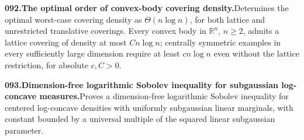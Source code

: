\documentclass[11pt,a4paper]{article}
\begin{document}
  \par \begin{minipage}{\linewidth}
  \fontsize{10.5}{12.6}\selectfont\RaggedRight
  \hypertarget{result 092}{}
  {\bfseries\textcolor{muted}{092.}\enspace The optimal order of convex-body covering density.}\enspace Determines the optimal worst-case covering density as $\Theta(n\log n)$, for both lattice and unrestricted translative coverings. Every convex body in $\mathbb R^n$, $n\ge2$, admits a lattice covering of density at most $Cn\log n$; centrally symmetric examples in every sufficiently large dimension require at least $cn\log n$ even without the lattice restriction, for absolute $c,C>0$.\par
  \end{minipage}\par\vspace{5pt}



  \par \begin{minipage}{\linewidth}
  \fontsize{10.5}{12.6}\selectfont\RaggedRight
  \hypertarget{result 093}{}
  {\bfseries\textcolor{muted}{093.}\enspace Dimension-free logarithmic Sobolev inequality for subgaussian log-concave measures.}\enspace Proves a dimension-free logarithmic Sobolev inequality for centered log-concave densities with uniformly subgaussian linear marginals, with constant bounded by a universal multiple of the squared linear subgaussian parameter.\par
  \end{minipage}\par\vspace{5pt}
\end{document}
